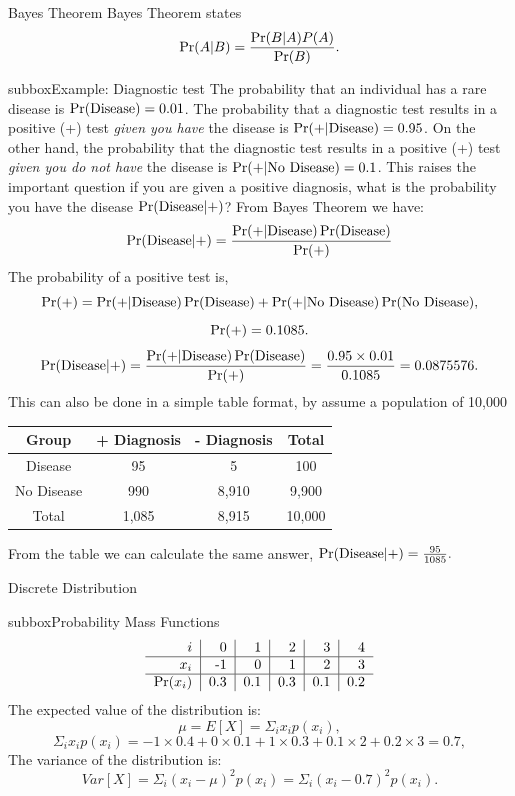 \documentclass[10pt,a4paper]{article}
\def\Pr{\mathop{\rm Pr}}
\begin{document}
\begin{multicols}{3}
\begin{textbox}{Bayes Theorem}
 Bayes Theorem states  
\[ \Pr(A|B)=\frac{\Pr(B|A)P(A)}{\Pr(B)}.\]
\begin{subbox}{subbox}{Example: Diagnostic test}
\tiny
The probability that an individual has a rare disease is $\Pr(\text{Disease})=0.01$. The probability that a diagnostic test results in a positive (+) test \textit{given you have} the disease is $\Pr(+|\text{Disease})=0.95$. On the other hand, the probability that the diagnostic test results in a positive (+) test \textit{given you do not have} the disease is $\Pr(+|\text{No Disease})=0.1$. 
This raises the important question if you are given a positive diagnosis, what is the probability you have the disease $\Pr(\text{Disease}|+)$? 
From Bayes Theorem we have:
\[ \Pr(\text{Disease}|+)=\frac{\Pr(+|\text{Disease})\Pr(\text{Disease})}{\Pr(+)}\]
The probability of a positive test is,
\[\Pr(+)= \Pr(+|\text{Disease})\Pr(\text{Disease})+\Pr(+|\text{No Disease})\Pr(\text{No Disease}),\]
\[\Pr(+)= 0.1085.\]
\[ \Pr(\text{Disease}|+)=\frac{\Pr(+|\text{Disease})\Pr(\text{Disease})}{\Pr(+)}=\frac{0.95\times 0.01}{0.1085}=0.0875576.\]
This can also be done in a simple table format, by assume a population of 10,000 
\begin{center}
 \begin{tabular}{||c |c c |c||} 
 \hline
  Group & + Diagnosis & - Diagnosis & Total \\
 \hline
 Disease & 95 & 5 & 100 \\ 
 \hline
 No Disease & 990 & 8,910 & 9,900 \\
 \hline
 Total & 1,085 & 8,915 & 10,000 \\
 \hline
 
\end{tabular}
\end{center}
From the table we can calculate the same answer,
 $\Pr(\text{Disease}|+)=\frac{95}{1085}.$\end{subbox}
\end{textbox}
\begin{textbox}{Discrete Distribution}
\begin{subbox}{subbox}{Probability Mass Functions}
\tiny
\[  \begin{tabular}{r|r|r|r|r|r}
			$i$&0&1&2&3&4\\
			\hline
			$x_i$&-1&0&1&2&3\\
			\hline
			$\Pr(x_i)$&0.3&0.1&0.3&0.1&0.2\\
			\end{tabular}
			\]
The expected value of the distribution is:
   	\[\mu=E[X]=\Sigma_{i} x_i p(x_i),\]
\[\Sigma_{i} x_i p(x_i)=-1\times 0.4+0\times 0.1+1\times 0.3+0.1\times 2+0.2\times 3=0.7,\]
The variance of the distribution is:
	\[Var[X]=\Sigma_{i} (x_i-\mu)^2 p(x_i)=\Sigma_{i} (x_i-0.7)^2 p(x_i).\]



\end{subbox}
\end{textbox}
\end{multicols}
\end{document}
